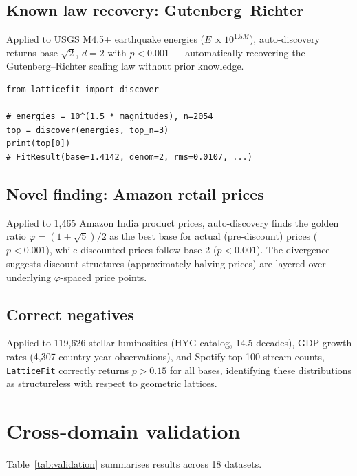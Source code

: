 \documentclass[preprint,12pt]{elsarticle}
\begin{document}
\subsection{Known law recovery: Gutenberg--Richter}

Applied to USGS M4.5+ earthquake energies
($E \propto 10^{1.5M}$), auto-discovery returns base $\sqrt{2}$,
$d = 2$ with $p < 0.001$ --- automatically recovering the
Gutenberg--Richter scaling law without prior knowledge.

\begin{lstlisting}
from latticefit import discover

# energies = 10^(1.5 * magnitudes), n=2054
top = discover(energies, top_n=3)
print(top[0])
# FitResult(base=1.4142, denom=2, rms=0.0107, ...)
\end{lstlisting}

\subsection{Novel finding: Amazon retail prices}

Applied to 1,465 Amazon India product prices, auto-discovery
finds the golden ratio $\varphi = (1+\sqrt{5})/2$ as the best
base for actual (pre-discount) prices ($p < 0.001$), while
discounted prices follow base 2 ($p < 0.001$). The divergence
suggests discount structures (approximately halving prices) are
layered over underlying $\varphi$-spaced price points.

\subsection{Correct negatives}

Applied to 119,626 stellar luminosities (HYG catalog, 14.5
decades), GDP growth rates (4,307 country-year observations),
and Spotify top-100 stream counts, \texttt{LatticeFit} correctly
returns $p > 0.15$ for all bases, identifying these distributions
as structureless with respect to geometric lattices.

\section{Cross-domain validation}

Table~\ref{tab:validation} summarises results across 18 datasets.
\end{document}
